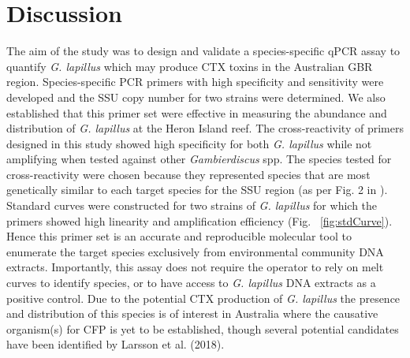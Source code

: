 \documentclass[12pt]{article}
\begin{document}
\section*{Discussion}
The aim of the study was to design and validate a species-specific qPCR assay to quantify \emph{G. lapillus} %
which may produce CTX toxins in the Australian GBR region. 
Species-specific PCR primers with high specificity and sensitivity were developed and the SSU copy number for two strains were determined. 
We also established that this primer set were effective in measuring the abundance and distribution of %
\textit{G. lapillus} at the Heron Island reef.
The cross-reactivity of primers designed in this study showed high specificity for both \emph{G. lapillus} %
while not amplifying when tested against other \emph{Gambierdiscus} spp. 
The species tested for cross-reactivity were chosen because they represented species that are most genetically similar to each target species for the SSU region (as per Fig. 2 in \citep{kretzschmar2017characterization}).
Standard curves were constructed for two strains of \emph{G. lapillus} %
for which the primers showed high linearity and amplification efficiency (Fig. ~\ref{fig:stdCurve}). 
Hence this primer set is an accurate and reproducible molecular tool to enumerate the target species exclusively from environmental community DNA extracts. 
Importantly, %
this assay does not require the operator to rely on melt curves to identify species, or to have access to \emph{G. lapillus} %
DNA extracts as a positive control. 
Due to the potential CTX production of \emph{G. lapillus} \citep{kretzschmar2017characterization,larsson2018toxicology} %
the presence and distribution of this species is of interest in Australia where the causative organism(s) for CFP is yet to be established, though several potential candidates have been identified by Larsson et al. (2018).\\
\end{document}
